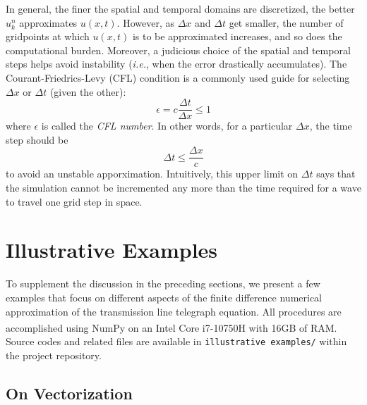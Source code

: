 \documentclass{article}
\begin{document}
In general, the finer the spatial and temporal domains are discretized, the better $u_{k}^{n}$ approximates $u \left(x,t\right)$.
However, as $\Delta x$ and $\Delta t$ get smaller, the number of gridpoints at which $u\left(x,t\right)$ is to be approximated increases,
and so does the computational burden.
Moreover, a judicious choice of the spatial and temporal steps helps avoid instability
(\textit{i.e.}, when the error drastically accumulates).
The Courant-Friedrics-Levy (CFL) condition is a commonly used guide for selecting $\Delta x$ or $\Delta t$ (given the other):
\begin{equation}
   \label{eqn: CFL condition}
   \epsilon = c \frac{\Delta t}{\Delta x} \leq 1
\end{equation}
where $\epsilon$ is called the \textit{CFL number}.
In other words, for a particular $\Delta x$, the time step should be
\begin{equation*}
   \Delta t \leq \frac{\Delta x}{c}
\end{equation*}
to avoid an unstable apporximation.
Intuitively, this upper limit on $\Delta t$ says that the simulation cannot be incremented any more than the time required
for a wave to travel one grid step in space.

\section{Illustrative Examples}
\label{sec: Illustrative Examples}

To supplement the discussion in the preceding sections, we present a few examples that focus on different aspects of
the finite difference numerical approximation of the transmission line telegraph equation.
All procedures are accomplished using NumPy \citep{NumPy2020} on an
Intel\textsuperscript{\textregistered} Core\textsuperscript{\texttrademark} i7-10750H with 16GB of RAM.
Source codes and related files are available in
{\tt illustrative examples/}
within the project repository.

\subsection{On Vectorization}
\label{subsec: On Vectorization}
\end{document}
